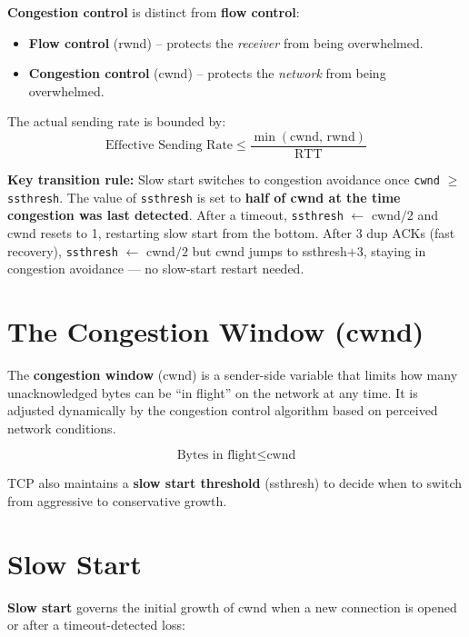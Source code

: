 \documentclass[11pt, letterpaper]{article}
\begin{document}
\textbf{Congestion control} is distinct from \textbf{flow control}:
\begin{itemize}[noitemsep]
  \item \textbf{Flow control} (rwnd) -- protects the \emph{receiver} from being overwhelmed.
  \item \textbf{Congestion control} (cwnd) -- protects the \emph{network} from being overwhelmed.
\end{itemize}

The actual sending rate is bounded by:
\[
  \text{Effective Sending Rate} \leq \frac{\min(\text{cwnd},\, \text{rwnd})}{\text{RTT}}
\]

\begin{tcolorbox}[colback=part4bg, colframe=sectionorange, arc=3pt, boxrule=1pt]
\textbf{Key transition rule:} Slow start switches to congestion avoidance once
\texttt{cwnd} $\geq$ \texttt{ssthresh}. The value of \texttt{ssthresh} is set to
\textbf{half of cwnd at the time congestion was last detected}. After a timeout,
\texttt{ssthresh} $\leftarrow$ cwnd$/2$ and cwnd resets to 1, restarting slow start
from the bottom. After 3 dup ACKs (fast recovery), \texttt{ssthresh} $\leftarrow$
cwnd$/2$ but cwnd jumps to ssthresh$+3$, staying in congestion avoidance --- no
slow-start restart needed.
\end{tcolorbox}


\section*{The Congestion Window (cwnd)}

The \textbf{congestion window} (cwnd) is a sender-side variable that limits how many unacknowledged bytes can be ``in flight'' on the network at any time. It is adjusted dynamically by the congestion control algorithm based on perceived network conditions.

\[
  \text{Bytes in flight} \leq \text{cwnd}
\]

TCP also maintains a \textbf{slow start threshold} (ssthresh) to decide when to switch from aggressive to conservative growth.

\section*{Slow Start}

\textbf{Slow start} governs the initial growth of cwnd when a new connection is opened or after a timeout-detected loss:
\end{document}
